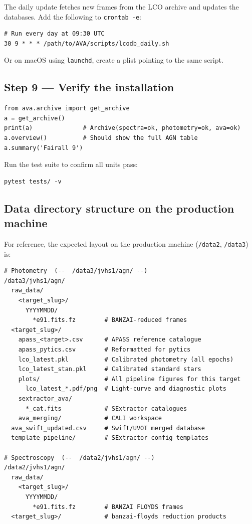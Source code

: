 \documentclass[12pt,a4paper]{article}
\begin{document}
The daily update fetches new frames from the LCO archive and updates the
databases.  Add the following to \texttt{crontab -e}:

\begin{lstlisting}[style=shell]
# Run every day at 09:30 UTC
30 9 * * * /path/to/AVA/scripts/lcodb_daily.sh
\end{lstlisting}

Or on macOS using \texttt{launchd}, create a plist pointing to the same script.

\subsection{Step 9 --- Verify the installation}

\begin{lstlisting}[style=python]
from ava.archive import get_archive
a = get_archive()
print(a)              # Archive(spectra=ok, photometry=ok, ava=ok)
a.overview()          # Should show the full AGN table
a.summary('Fairall 9')
\end{lstlisting}

Run the test suite to confirm all units pass:
\begin{lstlisting}[style=shell]
pytest tests/ -v
\end{lstlisting}

\subsection{Data directory structure on the production machine}

For reference, the expected layout on the production machine
(\texttt{/data2}, \texttt{/data3}) is:

\begin{lstlisting}[style=shell]
# Photometry  (--  /data3/jvhs1/agn/ --)
/data3/jvhs1/agn/
  raw_data/
    <target_slug>/
      YYYYMMDD/
        *e91.fits.fz        # BANZAI-reduced frames
  <target_slug>/
    apass_<target>.csv      # APASS reference catalogue
    apass_pytics.csv        # Reformatted for pytics
    lco_latest.pkl          # Calibrated photometry (all epochs)
    lco_latest_stan.pkl     # Calibrated standard stars
    plots/                  # All pipeline figures for this target
      lco_latest_*.pdf/png  # Light-curve and diagnostic plots
    sextractor_ava/
      *_cat.fits            # SExtractor catalogues
    ava_merging/            # CALI workspace
  ava_swift_updated.csv     # Swift/UVOT merged database
  template_pipeline/        # SExtractor config templates

# Spectroscopy  (--  /data2/jvhs1/agn/ --)
/data2/jvhs1/agn/
  raw_data/
    <target_slug>/
      YYYYMMDD/
        *e91.fits.fz        # BANZAI FLOYDS frames
  <target_slug>/            # banzai-floyds reduction products
\end{lstlisting}
\end{document}
